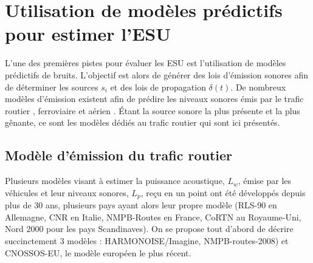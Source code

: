 \section{Utilisation de modèles prédictifs pour estimer l'ESU}

L'une des premières pistes pour évaluer les ESU est l'utilisation de modèles prédictifs de bruits. L'objectif est alors de générer des lois d'émission sonores afin de déterminer les sources $s_i$ et des lois de propagation $\delta(t)$. De nombreux modèles d'émission existent afin de prédire les niveaux sonores émis par le trafic routier \cite{quartieri2009review}, ferroviaire \cite{van2000railway} et aérien \cite{zaporozhets1998aircraft}. Étant la source sonore la plus présente et la plus gênante, ce sont les modèles dédiés au trafic routier qui sont ici présentés.


\subsection{Modèle d'émission du trafic routier}

Plusieurs modèles visant à estimer la puissance acoustique, $L_w$, émise par les véhicules et leur niveaux sonores, $L_p$, reçu en un point ont été développés depuis plus de 30 ans, plusieurs pays ayant alors leur propre modèle (RLS-90 en Allemagne, CNR en Italie, NMPB-Routes en France, CoRTN au Royaume-Uni, Nord 2000 pour les pays Scandinaves). On se propose tout d'abord de décrire succinctement 3 modèles : HARMONOISE/Imagine, NMPB-routes-2008) et CNOSSOS-EU, le modèle européen le plus récent. 

